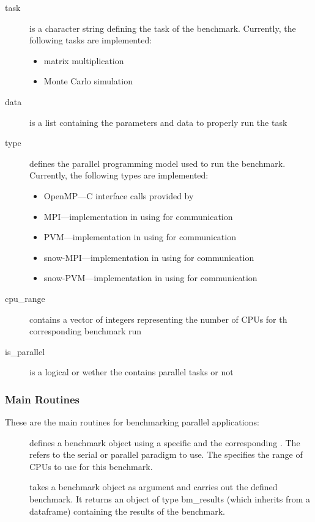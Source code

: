 \begin{Example}
\begin{description}
\item[task] is a character string defining the task of the
  benchmark. Currently, the 
  following tasks are implemented:
  \begin{itemize}
  \item matrix multiplication
  \item Monte Carlo simulation
  \end{itemize}
\item[data] is a list containing the parameters and data to properly
  run the task
\item[type]defines the parallel programming model used to run the
  benchmark. Currently, the following types are implemented:
  \begin{itemize}
  \item OpenMP---C interface calls provided by 
  \item MPI---implementation in  using  for
    communication
  \item PVM---implementation in  using  for
    communication 
  \item snow-MPI---implementation in  using  for
    communication
  \item snow-PVM---implementation in  using  for
    communication
  \end{itemize}
\item[cpu_range] contains a vector of integers representing the number
  of CPUs for th corresponding benchmark run 
\item[is_parallel] is a logical  or  wether the
  contains parallel tasks or not
\end{description}

\subsubsection{Main Routines}

These are the main routines for benchmarking parallel applications:

\begin{description}
\item[]
  defines a benchmark object using a specific  and the
  corresponding . The  refers to the serial or
  parallel paradigm to use. The  specifies the range
  of CPUs to use for this benchmark. 
\item[] takes a benchmark object as argument
  and carries out the defined benchmark. It returns an object of type
  bm_results (which inherits from a dataframe) containing the
  results of the benchmark.
\end{description}



\end{Example}
